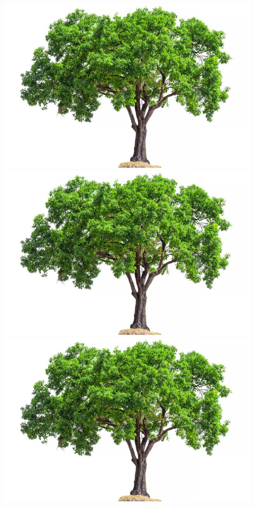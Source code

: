 \documentclass[12pt]{article}
\begin{document}
\begin{center}
\includegraphics[scale=.1]{figuras/tree.jpg} \quad
\includegraphics[scale=.15]{figuras/tree.jpg} \quad
\includegraphics[scale=.2]{figuras/tree.jpg} \quad

\end{center}
\end{document}
